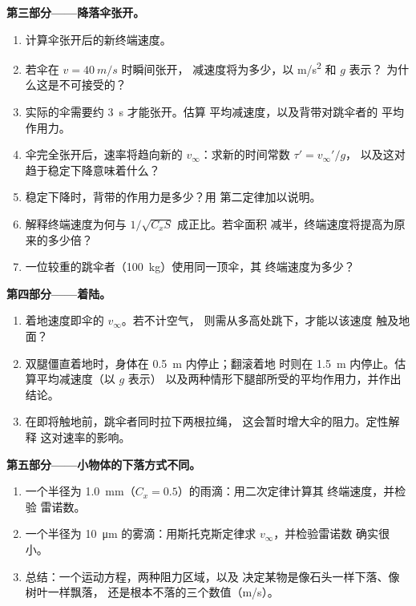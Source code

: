 \begin{problem}
\medskip
\noindent\textbf{第三部分——降落伞张开。}
\begin{enumerate}[resume]
  \item 计算伞张开后的新终端速度。
  \item 若伞在 $v = \qty{40}{m/s}$ 时瞬间张开，
        减速度将为多少，以 \unit{m/s^2} 和 $g$ 表示？
        为什么这是不可接受的？
  \item 实际的伞需要约 \qty{3}{s} 才能张开。估算
        平均减速度，以及背带对跳伞者的
        平均作用力。
  \item 伞完全张开后，速率将趋向新的
        $v_\infty$：求新的时间常数 $\tau' = v_\infty'/g$，
        以及这对趋于稳定下降意味着什么？
  \item 稳定下降时，背带的作用力是多少？用
        第二定律加以说明。
  \item 解释终端速度为何与 $1/\sqrt{C_xS}$ 成正比。若伞面积
        减半，终端速度将提高为原来的多少倍？
  \item 一位较重的跳伞者（\qty{100}{kg}）使用同一顶伞，其
        终端速度为多少？
\end{enumerate}

\medskip
\noindent\textbf{第四部分——着陆。}
\begin{enumerate}[resume]
  \item 着地速度即伞的 $v_\infty$。若不计空气，
        则需从多高处跳下，才能以该速度
        触及地面？
  \item 双腿僵直着地时，身体在 \qty{0.5}{m} 内停止；翻滚着地
        时则在 \qty{1.5}{m} 内停止。估算平均减速度（以 $g$ 表示）
        以及两种情形下腿部所受的平均作用力，并作出结论。
  \item 在即将触地前，跳伞者同时拉下两根拉绳，
        这会暂时增大伞的阻力。定性解释
        这对速率的影响。
\end{enumerate}

\medskip
\noindent\textbf{第五部分——小物体的下落方式不同。}
\begin{enumerate}[resume]
  \item 一个半径为 \qty{1.0}{mm}（$C_x = 0.5$）的雨滴：用二次定律计算其
        终端速度，并检验
        雷诺数。
  \item 一个半径为 \qty{10}{\micro m} 的雾滴：用斯托克斯定律求
        $v_\infty$，并检验雷诺数
        确实很小。
  \item 总结：一个运动方程，两种阻力区域，以及
        决定某物是像石头一样下落、像树叶一样飘落，
        还是根本不落的三个数值（\unit{m/s}）。
\end{enumerate}
\end{problem}

